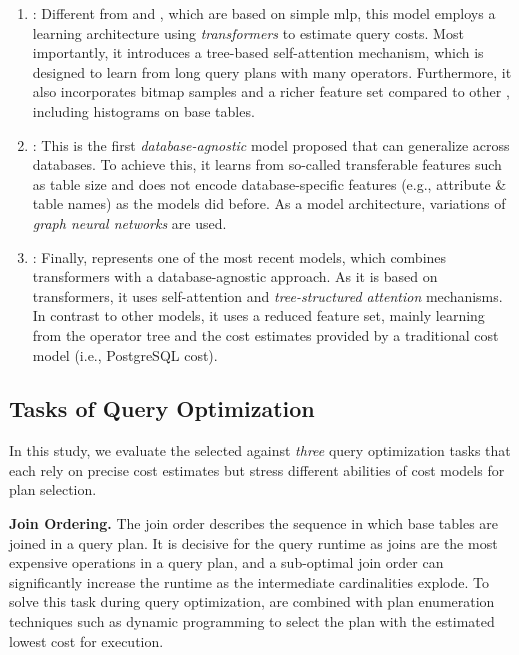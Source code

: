 \begin{enumerate}[leftmargin=*, nosep]
\item \queryformer \cite{zhao2022}:
    Different from \qppnet and \etoe, which are based on simple \ac{mlp}, this model employs a learning architecture using \textit{transformers} to estimate query costs. 
    Most importantly, it introduces a tree-based self-attention mechanism, which is designed to learn from long query plans with many operators.
    Furthermore, it also incorporates bitmap samples and a richer feature set compared to other \lcms, including histograms on base tables.
    
\item \zeroshot\cite{hilprecht2022}:
    This is the first \emph{database-agnostic} model proposed that can generalize across databases.
    To achieve this, it learns from so-called transferable features such as table size and does not encode database-specific features (e.g., attribute \& table names) as the models did before. 
    As a model architecture, variations of \textit{graph neural networks} are used. 

\item \dace \cite{zibo_liang_dace_2024}:
    Finally, \dace represents one of the most recent models, which combines transformers with a database-agnostic approach. 
    As it is based on transformers, it uses self-attention \cite{vaswani2017} and \textit{tree-structured attention} mechanisms.
    In contrast to other models, it uses a reduced feature set, mainly learning from the operator tree and the cost estimates provided by a traditional cost model (i.e., PostgreSQL cost). 
\end{enumerate}

\subsection{Tasks of Query Optimization}
In this study, we evaluate the selected \lcms against \textit{three} query optimization tasks that each rely on precise cost estimates but stress different abilities of cost models for plan selection.

\noindent\textbf{Join Ordering.}
The join order describes the sequence in which base tables are joined in a query plan.
It is decisive for the query runtime as joins are the most expensive operations in a query plan, and a sub-optimal join order can significantly increase the runtime as the intermediate cardinalities explode.
To solve this task during query optimization, \lcms are combined with plan enumeration techniques such as dynamic programming to select the plan with the estimated lowest cost for execution.

